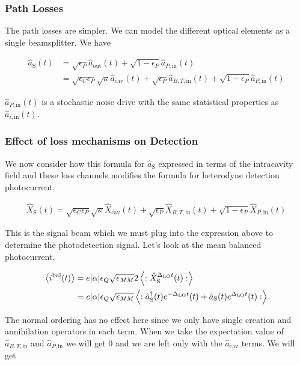 \documentclass[12pt]{article}
\newcommand{\ep}{\epsilon}
\begin{document}
\subsubsection{Path Losses}

The path losses are simpler. We can model the different optical elements as a single beamsplitter. We have

\begin{align}
\label{eq:sigandnoise}
\hat{a}_{\text{S}}(t) &= \sqrt{\ep_P}\hat{a}_{\text{out}}(t) + \sqrt{1-\ep_P}\hat{a}_{P,\text{in}}(t)\\
&= \sqrt{\ep_C \ep_P} \sqrt{\kappa}\hat{a}_{\text{cav}}(t) + \sqrt{\ep_P}\hat{a}_{B,T,\text{in}}(t) + \sqrt{1-\ep_P}\hat{a}_{P,\text{in}}(t)
\end{align}

$\hat{a}_{P,\text{in}}(t)$ is a stochastic noise drive with the same statistical properties as $\hat{a}_{i,\text{in}}(t)$.

\subsubsection{Effect of loss mechanisms on Detection}

We now consider how this formula for $\hat{a}_\text{S}$ expressed in terms of the intracavity field and these loss channels modifies the formula for heterodyne detection photocurrent.

\begin{align}
\hat{X}_{\text{S}}(t) = \sqrt{\ep_C\ep_P}\sqrt{\kappa}\hat{X}_{\text{cav}}(t) + \sqrt{\ep_P}\hat{X}_{B,T,\text{in}}(t) + \sqrt{1-\ep_P}\hat{X}_{P,\text{in}}(t)
\end{align}


This is the signal beam which we must plug into the expression above to determine the photodetection signal. Let's look at the mean balanced photocurrent.

\begin{align}
\Braket{i^{\text{bal}}(t)} &= e|\alpha|\ep_Q \sqrt{\ep_{MM}} 2\Braket{:\hat{X}_{\text{S}}^{\Delta_{\text{LO}}t}(t):}\\
&= e|\alpha|\ep_Q \sqrt{\ep_{MM}} \Braket{:\hat{a}^{\dag}_{\text{S}}(t)e^{-\Delta_{\text{LO}}t}(t) + \hat{a}_{\text{S}}(t)e^{\Delta_{\text{LO}}t}(t):}
\end{align}

The normal ordering has no effect here since we only have single creation and annihilation operators in each term. When we take the expectation value of $\hat{a}_{B,T,\text{in}}$ and $\hat{a}_{P,\text{in}}$ we will get $0$ and we are left only with the $\hat{a}_{\text{cav}}$ terms. We will get
\end{document}
